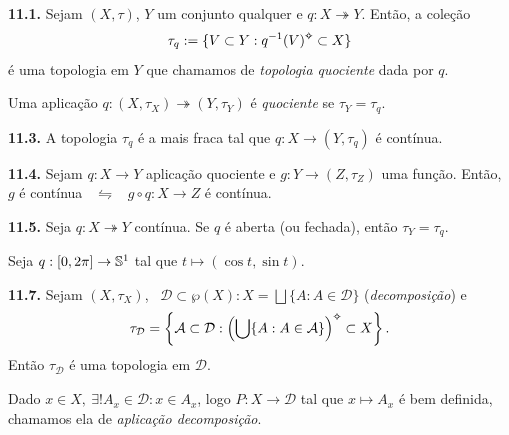 \begin{proposition}
    \textbf{11.1.} Sejam \((X, \tau)\), \(Y\) um conjunto qualquer e \(q : X \twoheadrightarrow Y\). Então, a coleção 
    \[\tau_q := \{V\subset Y : q^{-1}(V)\ab \subset X\}\] 
    é uma topologia em \(Y\) que chamamos de \emph{topologia quociente} dada por \(q\).
\end{proposition}

\begin{definition}
    Uma aplicação \(q: (X,\tau_X) \twoheadrightarrow (Y, \tau_Y)\) é \emph{quociente} se \(\tau_Y = \tau_q\).  
\end{definition}

\begin{proposition}
    \textbf{11.3.} A topologia \(\tau_q\) é a mais fraca tal que \(q: X \to (Y,\tau_q)\) é contínua. 
\end{proposition}

\begin{proposition}
    \textbf{11.4.} Sejam \(q : X \to Y\) aplicação quociente e \(g: Y \to (Z,\tau_Z)\) uma função. Então, \(g\) é contínua \ \(\leftrightharpoons\) \ \(g\circ q: X \to Z\) é contínua.
\end{proposition}

\hypertarget{prop115}{}
\begin{proposition}
    \textbf{11.5.} Seja \(q: X \twoheadrightarrow Y\) contínua. Se \(q\) é aberta (ou fechada), então \(\tau_Y = \tau_q\). 
\end{proposition}

\begin{example}
    Seja \(q : [0,2\pi] \to \mathbb{S}^1\) tal que  \(t \mapsto (\cos t, \sin t)\). 
\end{example}

\begin{proposition}
    \textbf{11.7.} Sejam \((X, \tau_X)\), \ \( \mathcal{D} \subset \wp(X) : X = \bigsqcup \{A : A \in \mathcal{D}\}\) (\emph{decomposição}) e  
    \[\tau_{\mathcal{D}} = \left\{\mathcal{A}\subset \mathcal{D} : \left(\bigcup \{A : A \in \mathcal{A}\}\right)\ab \subset X\right\}.\]
    Então \(\tau_{\mathcal{D}}\) é uma topologia em \(\mathcal{D}\). 
\end{proposition}

\begin{note}
    Dado \(x \in X, \ \exists ! A_x \in \mathcal{D} : x \in A_x \), logo \(P : X \to \mathcal{D}\) tal que \(x \mapsto A_x\) é bem definida, chamamos ela de \emph{aplicação decomposição}. 
\end{note}

